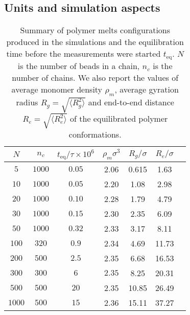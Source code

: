 \documentclass[pre,showpacs,notitlepage,twocolumn]{revtex4-1}
\begin{document}
\subsection*{Units and simulation aspects}
\begin{table}[t]
\begin{tabular}{ | c | c | c | c | c| c | c| }
 \hline
$N$ & $n_c$ & $t_{\text{eq}}/\tau \times 10^6$ & $\rho_{m} \sigma^3 $ &$R_g/\sigma$ & $R_e/\sigma$ \\
  \hline
  $5$ & $1000$  & $0.05$ & 2.06 &  0.615 & 1.63  \\
   \hline
 $10$ & $1000$  & $0.05$ & 2.20 & 1.08  & 2.98 \\
 \hline
 $20$ & $1000$  & $0.10$ & 2.28 &  1.79 & 4.79\\
 \hline
 $30$ & $1000$ & $0.15$ & 2.30 &  2.35 & 6.09\\
 \hline
 $50$ & $1000$  & $0.32$  &  2.33 & 3.17  & 8.11\\
 \hline
 $100$ & $320$  & $0.9$ & 2.34 & 4.69  &  11.73\\
 \hline
 $200$ & $500$  & $2.5$ & 2.35 & 6.68  & 16.53\\ %
 \hline
 $300$ & $300$  & $6$ & $2.35$ & 8.25   & 20.31 \\ %
 \hline
 $500$ & $500$  & $20$ &  2.35 & 10.85  & 26.49\\  %
 \hline
 $1000$ & $500$  & $15$  &  2.36 & 15.11  & 37.27\\ %
   \hline
   \end{tabular}
   \caption{Summary of polymer melts configurations  produced in the simulations and the equilibration time before the measurements were started   $t_{\text{eq}}$.  $N$ is the number of beads in
   a chain,  $n_c$ is the number of chains. We also report the values of  average monomer density $\rho_m$, average  gyration radius $R_g=\sqrt{\langle R_g^2 \rangle }$ and end-to-end distance $R_e=\sqrt{\langle R_e^2 \rangle }$ of the equilibrated polymer conformations. }
\end{table} 
\end{document}
